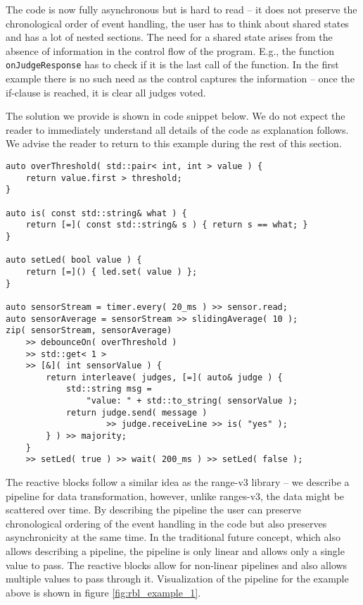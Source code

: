 The code is now fully asynchronous but is hard to read -- it does not preserve
the chronological order of event handling, the user has to think about shared
states and has a lot of nested sections. The need for a shared state arises from
the absence of information in the control flow of the program. E.g., the
function \texttt{onJudgeResponse} has to check if it is the last call of the
function. In the first example there is no such need as the control captures the
information -- once the if-clause is reached, it is clear all judges voted.

The solution we provide is shown in code snippet below. We do not expect the
reader to immediately understand all details of the code as explanation
follows. We advise the reader to return to this example during the rest of
this section.

\begin{verbatim}
auto overThreshold( std::pair< int, int > value ) {
    return value.first > threshold;
}

auto is( const std::string& what ) {
    return [=]( const std::string& s ) { return s == what; }
}

auto setLed( bool value ) {
    return [=]() { led.set( value ) };
}

auto sensorStream = timer.every( 20_ms ) >> sensor.read;
auto sensorAverage = sensorStream >> slidingAverage( 10 );
zip( sensorStream, sensorAverage)
    >> debounceOn( overThreshold )
    >> std::get< 1 >
    >> [&]( int sensorValue ) {
        return interleave( judges, [=]( auto& judge ) {
            std::string msg =
                "value: " + std::to_string( sensorValue );
            return judge.send( message )
                    >> judge.receiveLine >> is( "yes" );
        } ) >> majority;
    }
    >> setLed( true ) >> wait( 200_ms ) >> setLed( false );
\end{verbatim}

The reactive blocks follow a similar idea as the range-v3 library -- we describe
a pipeline for data transformation, however, unlike ranges-v3, the data might be
scattered over time. By describing the pipeline the user can preserve
chronological ordering of the event handling in the code but also preserves
asynchronicity at the same time. In the traditional future concept, which also
allows describing a pipeline, the pipeline is only linear and allows only a
single value to pass. The reactive blocks allow for non-linear pipelines and
also allows multiple values to pass through it. Visualization of the pipeline
for the example above is shown in figure \ref{fig:rbl_example_1}.

